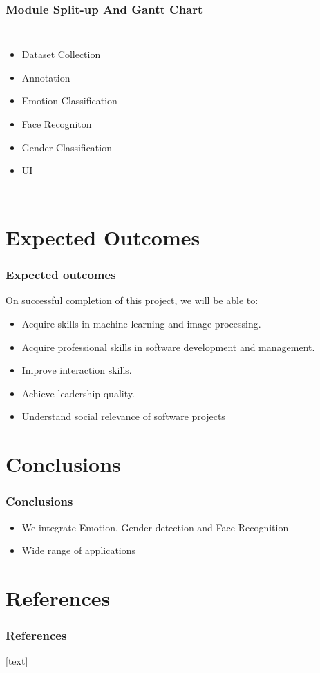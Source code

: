 \documentclass{beamer}
\begin{document}
	\begin{frame}
		
		\frametitle{Module Split-up And Gantt Chart}		
		\begin{columns}
			\begin{itemize}
				\item Dataset Collection
				\item Annotation			
				\item Emotion Classification
				\item Face Recogniton
				\item Gender Classification
				\item UI
			\end{itemize}
	\end{columns}
	\end{frame}		
	
	\section{Expected Outcomes}
		
	\begin{frame}
		\frametitle{Expected outcomes}
		\justifying
		On successful completion of this project, we will be able to:
		\begin{itemize}
			\item Acquire skills in machine learning and image processing.
			\item Acquire professional skills in software development and management.
			\item Improve interaction skills.
			\item Achieve leadership quality.
			\item Understand social relevance of software projects
		\end{itemize}
		
	\end{frame}
		
	\section{Conclusions}
	
	\begin{frame}
		\frametitle{Conclusions}
		
		\begin{itemize}
			
		\item We integrate Emotion, Gender detection and Face Recognition
		\item Wide range of applications
			
		\end{itemize}
		 
	\end{frame}		
	
	\section{References}
	
	\begin{frame}[allowframebreaks]
		\frametitle{References}
		\footnotesize{
			[text]
			
			}
	\end{frame}
		
\end{document}
